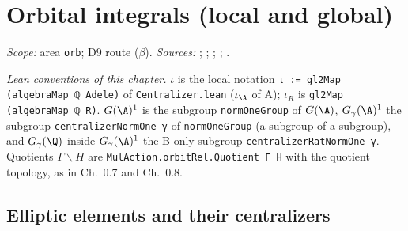 
\chapter{Orbital integrals (local and global)}\label{ch:ch-04-orbital}

\noindent\emph{Scope:} area \texttt{orb}; D9 route ($\beta$). \emph{Sources:} \cite[§8]{A-I}; \cite[§§10--11]{AIntro}; \cite[Lecture II §§1--2, Lecture IV §1]{Gel}; \cite{A-WOI}; \cite[§16]{JL}.

\noindent\emph{Lean conventions of this chapter.} $\iota$ is the local notation \texttt{ι := gl2Map (algebraMap ℚ Adele)} of
\texttt{Centralizer.lean} ($\iota_\A$ of A); $\iota_R$ is \texttt{gl2Map (algebraMap ℚ R)}. $G(\A)^1$ is the subgroup \texttt{normOneGroup} of
$G(\A)$, $G_\gamma(\A)^1$ the subgroup \texttt{centralizerNormOne γ} of \texttt{normOneGroup} (a subgroup of a subgroup), and $G_\gamma(\Q)$
inside $G_\gamma(\A)^1$ the B-only subgroup \texttt{centralizerRatNormOne γ}. Quotients $\Gamma\backslash H$ are
\texttt{MulAction.orbitRel.Quotient Γ H} with the quotient topology, as in Ch.~0.7 and Ch.~0.8.

\section{Elliptic elements and their centralizers}\label{sec:orb-centralizer}

